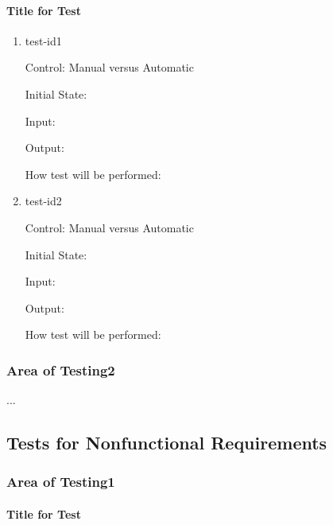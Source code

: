 \documentclass[12pt, titlepage]{article}
\begin{document}
\paragraph{Title for Test}

\begin{enumerate}

\item{test-id1\\}

Control: Manual versus Automatic
					
Initial State: 
					
Input: 
					
Output: 
					
How test will be performed: 
					
\item{test-id2\\}

Control: Manual versus Automatic
					
Initial State: 
					
Input: 
					
Output: 
					
How test will be performed: 

\end{enumerate}

\subsubsection{Area of Testing2}

...

\subsection{Tests for Nonfunctional Requirements}

\subsubsection{Area of Testing1}
		
\paragraph{Title for Test}
\end{document}
